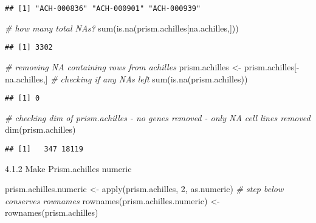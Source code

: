 \documentclass[
]{article}
\newenvironment{Shaded}{\begin{snugshade}}{\end{snugshade}}
\newcommand{\CommentTok}[1]{\textcolor[rgb]{0.56,0.35,0.01}{\textit{#1}}}
\newcommand{\DecValTok}[1]{\textcolor[rgb]{0.00,0.00,0.81}{#1}}
\newcommand{\FunctionTok}[1]{\textcolor[rgb]{0.00,0.00,0.00}{#1}}
\newcommand{\NormalTok}[1]{#1}
\newcommand{\OtherTok}[1]{\textcolor[rgb]{0.56,0.35,0.01}{#1}}
\newcommand{\SpecialCharTok}[1]{\textcolor[rgb]{0.00,0.00,0.00}{#1}}
\begin{document}
\begin{verbatim}
## [1] "ACH-000836" "ACH-000901" "ACH-000939"
\end{verbatim}

\begin{Shaded}
\begin{Highlighting}[]
\CommentTok{\# how many total NAs?}
\FunctionTok{sum}\NormalTok{(}\FunctionTok{is.na}\NormalTok{(prism.achilles[na.achilles,]))}
\end{Highlighting}
\end{Shaded}

\begin{verbatim}
## [1] 3302
\end{verbatim}

\begin{Shaded}
\begin{Highlighting}[]
\CommentTok{\# removing NA containing rows from achilles}
\NormalTok{prism.achilles }\OtherTok{\textless{}{-}}\NormalTok{ prism.achilles[}\SpecialCharTok{{-}}\NormalTok{na.achilles,]}
\CommentTok{\# checking if any NAs left}
\FunctionTok{sum}\NormalTok{(}\FunctionTok{is.na}\NormalTok{(prism.achilles))}
\end{Highlighting}
\end{Shaded}

\begin{verbatim}
## [1] 0
\end{verbatim}

\begin{Shaded}
\begin{Highlighting}[]
\CommentTok{\# checking dim of prism.achilles {-} no genes removed {-} only NA cell lines removed}
\FunctionTok{dim}\NormalTok{(prism.achilles)}
\end{Highlighting}
\end{Shaded}

\begin{verbatim}
## [1]   347 18119
\end{verbatim}

4.1.2 Make Prism.achilles numeric

\begin{Shaded}
\begin{Highlighting}[]
\NormalTok{prism.achilles.numeric }\OtherTok{\textless{}{-}} \FunctionTok{apply}\NormalTok{(prism.achilles, }\DecValTok{2}\NormalTok{, as.numeric)}
\CommentTok{\# step below conserves rownames }
\FunctionTok{rownames}\NormalTok{(prism.achilles.numeric) }\OtherTok{\textless{}{-}} \FunctionTok{rownames}\NormalTok{(prism.achilles)}
\end{Highlighting}
\end{Shaded}
\end{document}
